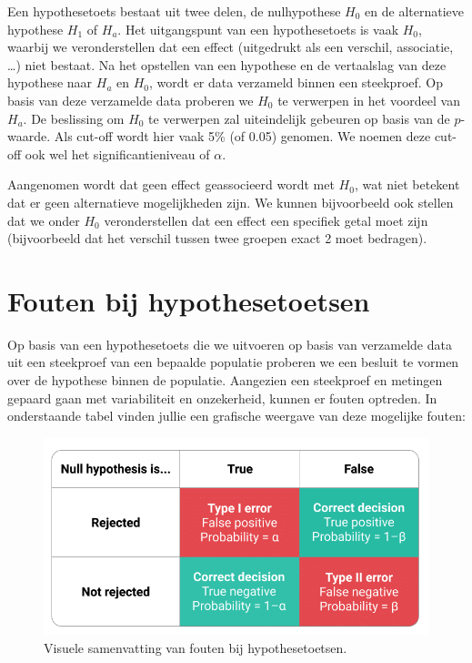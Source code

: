 \documentclass[
]{book}
\theoremstyle{definition}
\theoremstyle{definition}
\theoremstyle{definition}
\theoremstyle{definition}
\theoremstyle{remark}
\begin{document}
Een hypothesetoets bestaat uit twee delen, de nulhypothese \(H_0\) en de alternatieve hypothese \(H_1\) of \(H_a\). Het uitgangspunt van een hypothesetoets is vaak \(H_0\), waarbij we veronderstellen dat een effect (uitgedrukt als een verschil, associatie, \ldots) niet bestaat. Na het opstellen van een hypothese en de vertaalslag van deze hypothese naar \(H_a\) en \(H_0\), wordt er data verzameld binnen een steekproef. Op basis van deze verzamelde data proberen we \(H_0\) te verwerpen in het voordeel van \(H_a\). De beslissing om \(H_0\) te verwerpen zal uiteindelijk gebeuren op basis van de \(p\)-waarde. Als cut-off wordt hier vaak 5\% (of 0.05) genomen. We noemen deze cut-off ook wel het significantieniveau of \(\alpha\).

Aangenomen wordt dat geen effect geassocieerd wordt met \(H_0\), wat niet betekent dat er geen alternatieve mogelijkheden zijn. We kunnen bijvoorbeeld ook stellen dat we onder \(H_0\) veronderstellen dat een effect een specifiek getal moet zijn (bijvoorbeeld dat het verschil tussen twee groepen exact 2 moet bedragen).

\hypertarget{fouten-bij-hypothesetoetsen}{%
\section*{Fouten bij hypothesetoetsen}\label{fouten-bij-hypothesetoetsen}}


Op basis van een hypothesetoets die we uitvoeren op basis van verzamelde data uit een steekproef van een bepaalde populatie proberen we een besluit te vormen over de hypothese binnen de populatie. Aangezien een steekproef en metingen gepaard gaan met variabiliteit en onzekerheid, kunnen er fouten optreden. In onderstaande tabel vinden jullie een grafische weergave van deze mogelijke fouten:

\begin{figure}
\includegraphics[width=0.9\linewidth]{img/error} \caption{Visuele samenvatting van fouten bij hypothesetoetsen.}\label{fig:error}
\end{figure}
\end{document}
